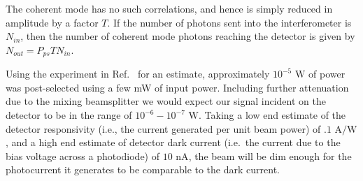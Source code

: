 The coherent mode has no such correlations, and hence is simply reduced in amplitude by a factor $T$.  If the number of photons sent into the interferometer is $N_{in}$, then the number of coherent mode photons reaching the detector is given by $N_{out} = P_{ps}TN_{in}$.  

Using the experiment in Ref.~\cite{Dixon2009} for an estimate, approximately $10^{-5} \text{ W}$ of power was post-selected using a few mW of input power.  Including further attenuation due to the mixing beamsplitter we would expect our signal incident on the detector to be in the range of $10^{-6}-10^{-7} \text{ W}$.  Taking a low end estimate of the detector responsivity (i.e., the current generated per unit beam power) of $.1 \text{ A/W}$, and a high end estimate of detector dark current (i.e.\ the current due to the bias voltage across a photodiode) of $10 \text{ nA}$, the beam will be dim enough for the photocurrent it generates to be comparable to the dark current.  

